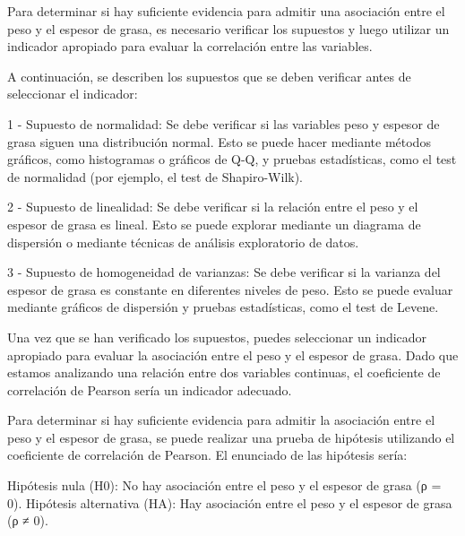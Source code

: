 \documentclass[
]{article}
\newenvironment{Shaded}{\begin{snugshade}}{\end{snugshade}}
\newcommand{\AttributeTok}[1]{\textcolor[rgb]{0.77,0.63,0.00}{#1}}
\newcommand{\FunctionTok}[1]{\textcolor[rgb]{0.00,0.00,0.00}{#1}}
\newcommand{\NormalTok}[1]{#1}
\newcommand{\OtherTok}[1]{\textcolor[rgb]{0.56,0.35,0.01}{#1}}
\newcommand{\SpecialCharTok}[1]{\textcolor[rgb]{0.00,0.00,0.00}{#1}}
\newcommand{\StringTok}[1]{\textcolor[rgb]{0.31,0.60,0.02}{#1}}
\begin{document}
Para determinar si hay suficiente evidencia para admitir una asociación
entre el peso y el espesor de grasa, es necesario verificar los
supuestos y luego utilizar un indicador apropiado para evaluar la
correlación entre las variables.

A continuación, se describen los supuestos que se deben verificar antes
de seleccionar el indicador:

1 - Supuesto de normalidad: Se debe verificar si las variables peso y
espesor de grasa siguen una distribución normal. Esto se puede hacer
mediante métodos gráficos, como histogramas o gráficos de Q-Q, y pruebas
estadísticas, como el test de normalidad (por ejemplo, el test de
Shapiro-Wilk).

2 - Supuesto de linealidad: Se debe verificar si la relación entre el
peso y el espesor de grasa es lineal. Esto se puede explorar mediante un
diagrama de dispersión o mediante técnicas de análisis exploratorio de
datos.

3 - Supuesto de homogeneidad de varianzas: Se debe verificar si la
varianza del espesor de grasa es constante en diferentes niveles de
peso. Esto se puede evaluar mediante gráficos de dispersión y pruebas
estadísticas, como el test de Levene.

Una vez que se han verificado los supuestos, puedes seleccionar un
indicador apropiado para evaluar la asociación entre el peso y el
espesor de grasa. Dado que estamos analizando una relación entre dos
variables continuas, el coeficiente de correlación de Pearson sería un
indicador adecuado.

Para determinar si hay suficiente evidencia para admitir la asociación
entre el peso y el espesor de grasa, se puede realizar una prueba de
hipótesis utilizando el coeficiente de correlación de Pearson. El
enunciado de las hipótesis sería:

Hipótesis nula (H0): No hay asociación entre el peso y el espesor de
grasa (ρ = 0). Hipótesis alternativa (HA): Hay asociación entre el peso
y el espesor de grasa (ρ ≠ 0).

\begin{Shaded}
\end{Shaded}
\end{document}
